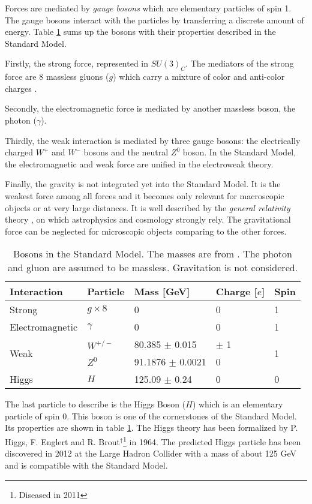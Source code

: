 Forces are mediated by \textit{gauge bosons} which are elementary particles of spin 1. The gauge bosons interact with the particles by transferring a discrete amount of energy. Table \ref{table:Bosons} sums up the bosons with their properties described in the Standard Model.

Firstly, the strong force, represented in $SU(3)_{C}$. The mediators of the strong force are 8 massless gluons ($g$) which carry a mixture of color and anti-color charges \cite{Griffiths:343277}.

Secondly, the electromagnetic force is mediated by another massless boson, the photon ($\gamma$).

Thirdly, the weak interaction is mediated by three gauge bosons: the electrically charged $W^+$ and $W^-$ bosons and the neutral $Z^0$ boson. In the Standard Model, the electromagnetic and weak force are unified in the electroweak theory.

Finally, the gravity is not integrated yet into the Standard Model. It is the weakest force among all forces and it becomes only relevant for macroscopic objects or at very large distances. It is well described by the \textit{general relativity} theory \cite{Einstein:1905ve}, on which astrophysics and cosmology strongly rely. The gravitational force can be neglected for microscopic objects comparing to the other forces.

\begin{table}[htb!]
  \centering
  \caption{Bosons in the Standard Model. The masses are from \cite{Patrignani:2016xqp}. The photon and gluon are assumed to be massless. Gravitation is not considered.}
  \label{table:Bosons}
  \begin{tabular}{@{}lllll@{}} \toprule
    Interaction & Particle & Mass [GeV] & Charge [$e$] & Spin\\
    \midrule
    Strong & $g \times 8$ & 0 & 0 & 1\\
    Electromagnetic & $\gamma$ & 0 & 0 & 1\\
    \multirow{2}{*}{Weak} & $W^{+/-}$ & 80.385 $\pm$ 0.015 & $\pm$ 1 & \multirow{2}{*}{1}\\
    & $Z^0$ & 91.1876 $\pm$ 0.0021 & 0 &\\
    Higgs & $H$ & 125.09 $\pm$ 0.24 & 0 & 0\\
    \bottomrule
  \end{tabular}
\end{table}

The last particle to describe is the Higgs Boson ($H$) which is an elementary particle of spin 0. This boson is one of the cornerstones of the Standard Model. Its properties are shown in table \ref{table:Bosons}. The Higgs theory \cite{Higgs:1964pj, Englert:1964et} has been formalized by P. Higgs, F. Englert and R. Brout$^\dagger$\footnote{Diseased in 2011} in 1964. The predicted Higgs particle has been discovered in 2012 at the Large Hadron Collider \cite{Aad:2012tfa, Chatrchyan:2012xdj} with a mass of about 125 GeV and is compatible with the Standard Model.

